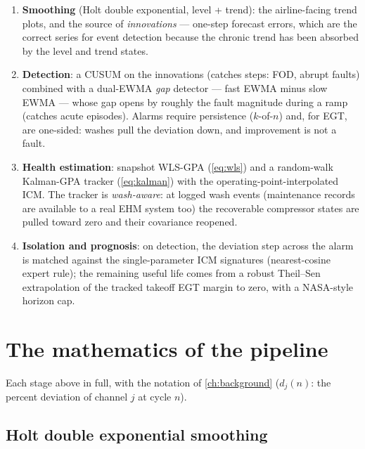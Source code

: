 \begin{enumerate}
  \item \textbf{Smoothing} (Holt double exponential, level + trend): the airline-facing trend
    plots, and the source of \emph{innovations} --- one-step forecast errors, which are the
    correct series for event detection because the chronic trend has been absorbed by the
    level and trend states.
  \item \textbf{Detection}: a CUSUM on the innovations (catches steps: FOD, abrupt faults)
    combined with a dual-EWMA \emph{gap} detector --- fast EWMA minus slow EWMA --- whose gap
    opens by roughly the fault magnitude during a ramp (catches acute episodes). Alarms
    require persistence ($k$-of-$n$) and, for EGT, are one-sided: washes pull the deviation
    down, and improvement is not a fault.
  \item \textbf{Health estimation}: snapshot WLS-GPA (\cref{eq:wls}) and a random-walk
    Kalman-GPA tracker (\cref{eq:kalman}) with the operating-point-interpolated ICM. The
    tracker is \emph{wash-aware}: at logged wash events (maintenance records are available to
    a real EHM system too) the recoverable compressor states are pulled toward zero and their
    covariance reopened.
  \item \textbf{Isolation and prognosis}: on detection, the deviation step across the alarm is
    matched against the single-parameter ICM signatures (nearest-cosine expert rule); the
    remaining useful life comes from a robust Theil--Sen extrapolation of the tracked takeoff
    EGT margin to zero, with a NASA-style horizon cap.
\end{enumerate}

\section{The mathematics of the pipeline}
\label{sec:trad-math}

Each stage above in full, with the notation of \cref{ch:background} ($d_j(n)$: the percent
deviation of channel $j$ at cycle $n$).

\subsection{Holt double exponential smoothing}
\label{sec:math-holt}

